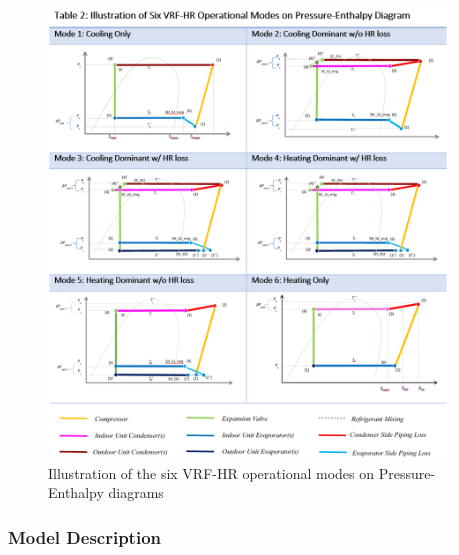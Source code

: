 \begin{figure}[hbtp] %
\centering
\includegraphics[width=0.95\textwidth, keepaspectratio=true]{media/VRF-HR-Chart-EnthalpyPressure.png}
\caption{Illustration of the six VRF-HR operational modes on Pressure-Enthalpy diagrams \label{fig:VRF-HR-Chart-EnthalpyPressure}}
\end{figure}

\subsubsection{Model Description}\label{vrf-heat-pump-model-description-2016-07-20-09-10}

